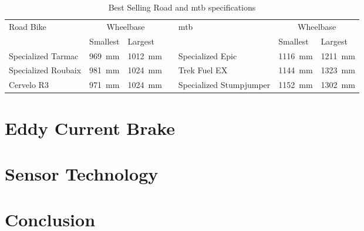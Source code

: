 \begin{table}[ht]
	\renewcommand{\arraystretch}{1.2}
	\centering
	\caption{Best Selling Road and \ac{mtb} specifications} 
	\begin{tabularx}{\textwidth}{p{2.6cm} X Xp{0.05cm} p{2.6cm} X X}
		\toprule
		Road Bike           & \multicolumn{2}{c}{Wheelbase} &                         & \ac{mtb} & \multicolumn{2}{c}{Wheelbase}                                                     \\
		                    & Smallest                      & Largest                 &          &                               & Smallest                & Largest                 \\
		\midrule
		Specialized Tarmac  & \SI{969}{\milli\meter}        & \SI{1012}{\milli\meter} &          & Specialized Epic              & \SI{1116}{\milli\meter} & \SI{1211}{\milli\meter} \\
		Specialized Roubaix & \SI{981}{\milli\meter}        & \SI{1024}{\milli\meter} &          & Trek Fuel EX                  & \SI{1144}{\milli\meter} & \SI{1323}{\milli\meter} \\
		Cervelo R3          & \SI{971}{\milli\meter}        & \SI{1024}{\milli\meter} &          & Specialized Stumpjumper       & \SI{1152}{\milli\meter} & \SI{1302}{\milli\meter} \\
		\bottomrule
	\end{tabularx}
	\label{tab:bikes}
\end{table}

\section{Eddy Current Brake}
\section{Sensor Technology}
\section{Conclusion}
